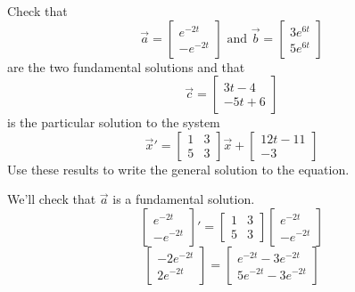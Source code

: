 \begin{example}
	Check that 
	\begin{equation*}
		\vec{a} = \begin{bmatrix}
			e^{-2t} \\
			-e^{-2t}
		\end{bmatrix} \text{ and } \vec{b} = \begin{bmatrix}
			3e^{6t} \\
			5e^{6t}
		\end{bmatrix}
	\end{equation*} 
	are the two fundamental solutions and that
	\begin{equation*}
		\vec{c} = \begin{bmatrix}
			3t - 4 \\
			-5t + 6
		\end{bmatrix}
	\end{equation*}
	is the particular solution to the system
	\begin{equation*}
		\vec{x}' = \begin{bmatrix}
			1 & 3 \\
			5 & 3
		\end{bmatrix} \vec{x} + \begin{bmatrix}
			12t - 11 \\
			-3
		\end{bmatrix}
	\end{equation*}
	Use these results to write the general solution to the equation.
\end{example}
\noindent
We'll check that $\vec{a}$ is a fundamental solution.
\begin{equation*}
	\begin{bmatrix}
		e^{-2t} \\
		-e^{-2t}
	\end{bmatrix}' = \begin{bmatrix}
		1 & 3 \\
		5 & 3
	\end{bmatrix} \begin{bmatrix}
		e^{-2t} \\
		-e^{-2t}
	\end{bmatrix}
\end{equation*}
\begin{equation*}
	\begin{bmatrix}
		-2e^{-2t} \\
		2e^{-2t}
	\end{bmatrix} = \begin{bmatrix}
		e^{-2t} - 3e^{-2t} \\
		5e^{-2t} - 3e^{-2t}
	\end{bmatrix}
\end{equation*}
